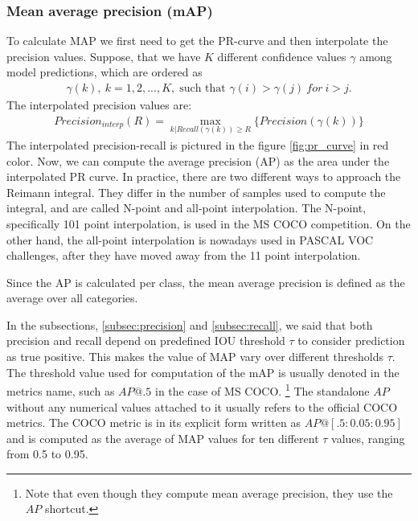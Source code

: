 \subsubsection{Mean average precision (mAP)}
To calculate MAP we first need to get the PR-curve and then interpolate the precision values. Suppose, that we have $K$ different confidence values $\gamma$ among model predictions, which are ordered as
\begin{align}
    \gamma(k),\: k = 1,2,...,K,  \; \text{such that } \gamma(i) > \gamma(j) \: for \: i > j.
\end{align}
The interpolated precision values are:
\begin{align}
    Precision_{interp}(R) = \max_{k|Recall(\gamma(k)) \geq R} \{  Precision(\gamma(k)) \}
\end{align}
The interpolated precision-recall is pictured in the figure \ref{fig:pr_curve} in red color. Now, we can compute the average precision (AP) as the area under the interpolated PR curve.
In practice, there are two different ways to approach the Reimann integral. They differ in the number of samples used to compute the integral, and are called N-point and all-point interpolation. The N-point, specifically 101 point interpolation, is used in the MS COCO competition. On the other hand, the all-point interpolation is nowadays used in PASCAL VOC challenges, after they have moved away from the 11 point interpolation.


Since the AP is calculated per class, the mean average precision is defined as the average over all categories.

In the subsections, \ref{subsec:precision} and \ref{subsec:recall}, we said that both precision and recall depend on predefined IOU threshold $\tau$ to consider prediction as true positive. This makes the value of MAP vary over different thresholds $\tau$. The threshold value used for computation of the mAP is usually denoted in the metrics name, such as $AP@.5$ in the case of MS COCO. \footnote{Note that even though they compute mean average precision, they use the $AP$ shortcut.} The standalone $AP$ without any numerical values attached to it usually refers to the official COCO metrics. The COCO metric is in its explicit form written as $AP@[.5:0.05:0.95]$ and is computed as the average of MAP values for ten different $\tau$ values, ranging from 0.5 to 0.95.

